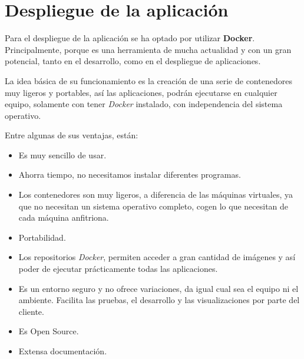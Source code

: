 \section{Despliegue de la aplicación}

Para el despliegue de la aplicación se ha optado por utilizar \textbf{Docker}. Principalmente, porque es una herramienta de mucha actualidad y con un gran potencial, tanto en el desarrollo, como en el despliegue de aplicaciones.

La idea básica de su funcionamiento es la creación de una serie de contenedores muy ligeros y portables, así las aplicaciones, podrán ejecutarse en cualquier equipo, solamente con tener \emph{Docker} instalado, con independencia del sistema operativo.

Entre algunas de sus ventajas, están:

\begin{itemize}
\item Es muy sencillo de usar.
\item Ahorra tiempo, no necesitamos instalar diferentes programas.
\item Los contenedores son muy ligeros, a diferencia de las máquinas virtuales, ya que no necesitan un sistema operativo completo, cogen lo que necesitan de cada máquina anfitriona.
\item Portabilidad.
\item Los repositorios \emph{Docker}, permiten acceder a gran cantidad de imágenes y así poder de ejecutar prácticamente todas las aplicaciones.
\item Es un entorno seguro y no ofrece variaciones, da igual cual sea el equipo ni el ambiente. Facilita las pruebas, el desarrollo y las visualizaciones por parte del cliente.
\item Es Open Source.
\item Extensa documentación.
\end{itemize}
